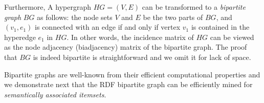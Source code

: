 Furthermore, A hypergraph $HG = (V, E)$ can be transformed to a \emph{bipartite graph} $BG$ as follows:
the node sets $V$ and $E$ be the two parts of $BG$, and $(v_1, e_1)$ is connected with an edge if and only if vertex $v_1$ is contained in the hyperedge $e_1$ in $HG$. In other words, the incidence matrix of $HG$ can be viewed as the node adjacency (biadjacency) matrix of the bipartite graph. The proof that $BG$ is indeed bipartite is straightforward and we omit it for lack of space.


Bipartite graphs are well-known from their efficient computational properties and we demonstrate next that the RDF bipartite graph can be efficiently mined for \emph{semantically associated itemsets}.

%
%

